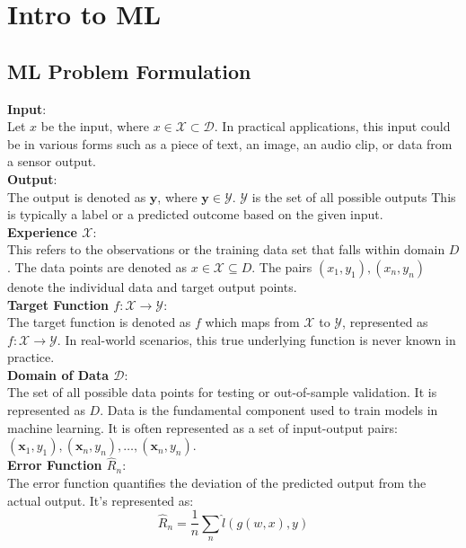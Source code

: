 \chapter{Intro to ML}


\section{ML Problem Formulation}

\textbf{Input}: \\
Let $x$ be the input, where $x\in\mathcal{X}\subset\mathcal{D}$. In practical applications, this input could be in various forms such as a piece of text, an image, an audio clip, or data from a sensor output.\\

\textbf{Output}: \\
The output is denoted as $\mathbf{y}$, where $\mathbf{y}\in\mathcal{Y}$. $\mathcal{Y}$ is the set of all possible outputs This is typically a label or a predicted outcome based on the given input.\\

\textbf{Experience \(\mathcal{X}\)}: \\
This refers to the observations or the training data set that falls within domain \(D\). The data points are denoted as \(x \in \mathcal{X} \subseteq D\). The pairs \((x_1, y_1), (x_n, y_n)\) denote the individual data and target output points.\\


\textbf{Target Function $f:\mathcal{X}\to\mathcal{Y}$}: \\
The target function is denoted as $f$ which maps from $\mathcal{X}$ to $\mathcal{Y}$, represented as $f:\mathcal{X}\to\mathcal{Y}$. In real-world scenarios, this true underlying function is never known in practice.\\

\textbf{Domain of Data $\mathcal{D}$}: \\
The set of all possible data points for testing or out-of-sample validation. It is represented as \(D\). Data is the fundamental component used to train models in machine learning. It is often represented as a set of input-output pairs: $(\mathbf{x}_1,y_1),(\mathbf{x}_n,y_n),\ldots,(\mathbf{x}_n,y_n)$. \\

\textbf{Error Function $\widehat{R}_n$}: \\
The error function quantifies the deviation of the predicted output from the actual output. It's represented as:
\[
\widehat{R}_n=\frac1n\sum_n\widehat{l}(g(w,x),y)
\]\\

